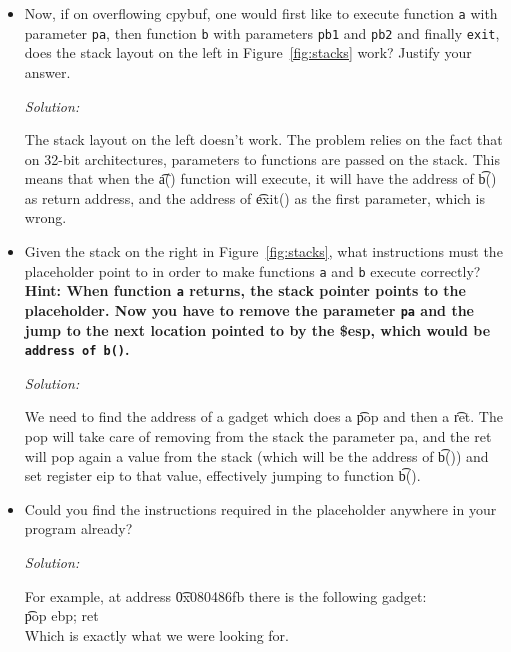 \documentclass[a4paper,11pt]{article}
\newenvironment{solution}%
{\par{\noindent\small\textit{Solution:}}\vspace{-1ex}\begin{framed}}%
{\end{framed}\par}
\begin{document}
\begin {itemize}
  \item Now, if on overflowing cpybuf, one would first like to execute function
  \texttt{a} with parameter \texttt{pa}, then function \texttt{b} with
  parameters \texttt{pb1} and \texttt{pb2}  and finally \texttt{exit}, does the
  stack layout on the left in Figure~\ref{fig:stacks} work? Justify your answer.

  \ifsolution
  \begin{solution}
	  The stack layout on the left doesn't work. The problem relies on the fact that 
	  on 32-bit architectures, parameters to functions are passed on the stack. This means
	  that when the \t{a()} function will execute, it will have the address of \t{b()} as
	  return address, and the address of \t{exit()} as the first parameter, which is wrong.
\end{solution}
  \fi

  \item Given the stack on the right in Figure~\ref{fig:stacks}, what
  instructions must the placeholder point to in order to make functions
  \texttt{a} and \texttt{b} execute correctly? \textbf{Hint: When function
  \texttt{a} returns, the stack pointer points to the placeholder. Now you have
  to remove the parameter \texttt{pa} and the jump to the next location pointed
  to by the \$esp, which would be \texttt{address of b()}.}
    
  \ifsolution
  \begin{solution}
	  We need to find the address of a gadget which does a \t{pop} and then a \t{ret}.
	  The pop will take care of removing from the stack the parameter pa, and the ret will
	  pop again a value from the stack (which will be the address of \t{b()}) and set register
	  eip to that value, effectively jumping to function \t{b()}.
\end{solution}
  \fi

  \item Could you find the instructions required in the placeholder anywhere in
  your program already?

  \ifsolution
  \begin{solution}
	  For example, at address \t{0x080486fb} there is the following gadget:\\
	  \t{pop ebp; ret}\\
	  Which is exactly what we were looking for.
\end{solution}
  \fi
\end{itemize}
\end{document}
